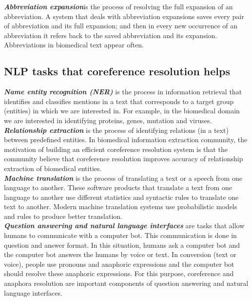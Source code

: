 \emph{\textbf{Abbreviation expansion}}is the process of resolving the full expansion of an abbreviation. A system that deals with abbreviation expansions saves every pair of abbreviation and its full expansion; and then in every new occurrence of an abbreviation it refers back to the saved abbreviation and its expansion. Abbreviations in biomedical text appear often. \\

\subsection{NLP tasks that coreference resolution helps}

\emph {\textbf{ Name entity recognition (NER)}} is the process in information retrieval that identifies and classifies mentions in a text that corresponds to a target group (entities) in which we are interested in. For example, in the biomedical domain we are interested in identifying proteins, genes, mutation and viruses. \\

\emph{\textbf{Relationship extraction}} is the process of identifying relations (in a text) between predefined entities. In biomedical information extraction community, the motivation of building an efficient coreference resolution system is that the community believe that coreference resolution improves accuracy of relationship extraction of biomedical entities. \\

\emph{\textbf{Machine translation}} is the process of translating a text or a speech from one language to another. These software products that translate a text from one language to another use different statistics and syntactic rules to translate one text to another. Modern machine translation systems use probabilistic models and rules to produce better translation. \\

\emph{\textbf{Question answering and natural language interfaces}} are tasks that allow humans to communicate with a computer bot. This communication is done in question and answer format. In this situation, humans ask a computer bot and the computer bot answers the humans by voice or text. In conversion (text or voice), people use pronouns and anaphoric expressions and the computer bot should resolve these anaphoric expressions. For this purpose, coreference and anaphora resolution are important components of question answering and natural language interfaces.\\

